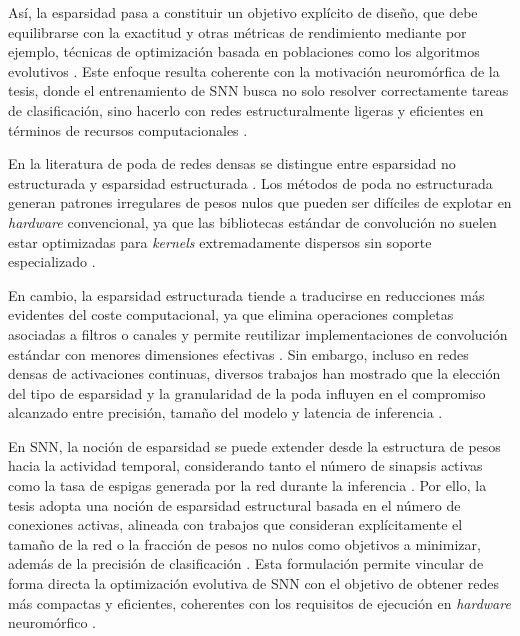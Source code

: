 Así, la esparsidad pasa a constituir un objetivo explícito de diseño, que debe equilibrarse con la exactitud y otras métricas de rendimiento mediante por ejemplo, técnicas de optimización basada en poblaciones como los algoritmos evolutivos \cite{REINERS2022sparse, Huang2021sparse-opti-multi}. Este enfoque resulta coherente con la motivación neuromórfica de la tesis, donde el entrenamiento de SNN busca no solo resolver correctamente tareas de clasificación, sino hacerlo con redes estructuralmente ligeras y eficientes en términos de recursos computacionales \cite{dimovska2020multiobjectiveoptimizationsizeresilience, Schuman2022Opportunities}.

En la literatura de poda de redes densas se distingue entre esparsidad no estructurada y esparsidad estructurada \cite{Yang2019-mo-cnn-ga, LIAN2024-multi-cnn-ea}. Los métodos de poda no estructurada generan patrones irregulares de pesos nulos que pueden ser difíciles de explotar en \textit{hardware} convencional, ya que las bibliotecas estándar de convolución no suelen estar optimizadas para \textit{kernels} extremadamente dispersos sin soporte especializado \cite{HIRSCH2022-mo-dnn-drl, LIAN2024-multi-cnn-ea}. 

En cambio, la esparsidad estructurada tiende a traducirse en reducciones más evidentes del coste computacional, ya que elimina operaciones completas asociadas a filtros o canales y permite reutilizar implementaciones de convolución estándar con menores dimensiones efectivas \cite{Chen2021-sparse-nn-moo, LIAN2024-multi-cnn-ea, HIRSCH2022-mo-dnn-drl}. Sin embargo, incluso en redes densas de activaciones continuas, diversos trabajos han mostrado que la elección del tipo de esparsidad y la granularidad de la poda influyen en el compromiso alcanzado entre precisión, tamaño del modelo y latencia de inferencia \cite{REINERS2022sparse, Yang2019-mo-cnn-ga}.

En SNN, la noción de esparsidad se puede extender desde la estructura de pesos hacia la actividad temporal, considerando tanto el número de sinapsis activas como la tasa de espigas generada por la red durante la inferencia \cite{dimovska2020multiobjectiveoptimizationsizeresilience, Jin2007evo-multi-snn, Schuman2022Opportunities}. Por ello, la tesis adopta una noción de esparsidad estructural basada en el número de conexiones activas, alineada con trabajos que consideran explícitamente el tamaño de la red o la fracción de pesos no nulos como objetivos a minimizar, además de la precisión de clasificación \cite{Huang2021sparse-opti-multi, dimovska2020multiobjectiveoptimizationsizeresilience}. Esta formulación permite vincular de forma directa la optimización evolutiva de SNN con el objetivo de obtener redes más compactas y eficientes, coherentes con los requisitos de ejecución en \textit{hardware} neuromórfico \cite{LIAN2024-multi-cnn-ea, Schuman2022Opportunities}.

